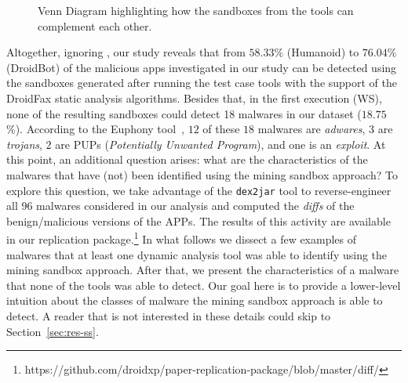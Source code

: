 \begin{figure}[htb]
  \caption{Venn Diagram highlighting how the sandboxes from the tools can
    complement each other.}
  \label{fig:venn-plot1}
\end{figure}


Altogether, ignoring  \joke, our study reveals that from $58.33$\% (Humanoid)
to $76.04$\% (DroidBot) of the malicious apps investigated in our study can be
detected using the sandboxes generated after running the test case tools with the support of the
DroidFax static analysis algorithms. Besides that, in the first execution (WS), none of the
resulting sandboxes could detect 18 malwares in our dataset ($18.75$\%). According to
the Euphony tool~\cite{hurier2017euphony}, $12$ of these $18$ malwares are \emph{adwares}, $3$ are \emph{trojans}, $2$ are
PUPs (\emph{Potentially Unwanted Program}), and one is an \emph{exploit}.
At this point, an additional question arises: what are the characteristics
of the malwares that have (not) been identified using the mining sandbox approach?
To explore this question, we take advantage of the
\texttt{dex2jar} tool to reverse-engineer all 96 malwares considered in our analysis and
computed the \emph{diffs} of the benign/malicious versions of the APPs.
The results of this activity are available in our replication
package.\footnote{https://github.com/droidxp/paper-replication-package/blob/master/diff/} 
In what follows we dissect a few examples of malwares
that at least one dynamic analysis tool was able to
identify using the mining sandbox approach. After that,
we present the characteristics of a malware that none of the tools
was able to detect. Our goal here is to provide
a lower-level intuition about the classes of malware the
mining sandbox approach is able to detect. A reader that
is not interested in these details could skip to
Section~\ref{sec:res-ss}.

